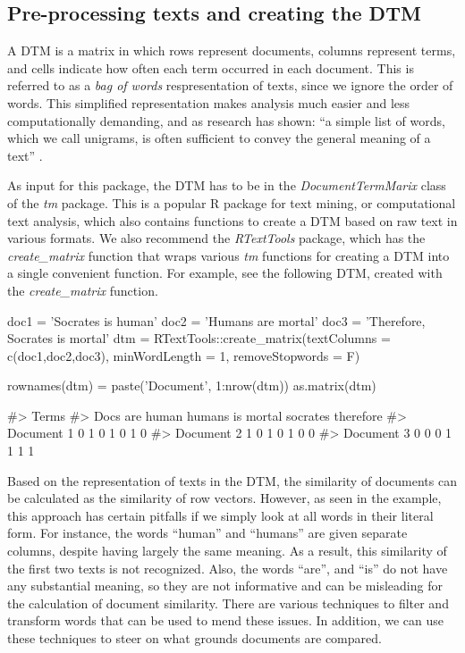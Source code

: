 \subsection{Pre-processing texts and creating the DTM}

A DTM is a matrix in which rows represent documents, columns represent
terms, and cells indicate how often each term occurred in each document.
This is referred to as a \emph{bag of words} respresentation of texts,
since we ignore the order of words. This simplified representation makes
analysis much easier and less computationally demanding, and as research
has shown: ``a simple list of words, which we call unigrams, is often
sufficient to convey the general meaning of a text''
\citep[6]{grimmer13}.

As input for this package, the DTM has to be in the
\emph{DocumentTermMarix} class of the \emph{tm} package. This is a
popular R package for text mining, or computational text analysis, which
also contains functions to create a DTM based on raw text in various
formats. We also recommend the \emph{RTextTools} package, which has the
\emph{create\_matrix} function that wraps various \emph{tm} functions
for creating a DTM into a single convenient function. For example, see
the following DTM, created with the \emph{create\_matrix} function.

\begin{Schunk}
\begin{Sinput}
doc1 = 'Socrates is human'
doc2 = 'Humans are mortal'
doc3 = 'Therefore, Socrates is mortal'
dtm = RTextTools::create_matrix(textColumns = c(doc1,doc2,doc3), 
                                minWordLength = 1, removeStopwords = F)

rownames(dtm) = paste('Document', 1:nrow(dtm))
as.matrix(dtm)
\end{Sinput}
\begin{Soutput}
#>             Terms
#> Docs         are human humans is mortal socrates therefore
#>   Document 1   0     1      0  1      0        1         0
#>   Document 2   1     0      1  0      1        0         0
#>   Document 3   0     0      0  1      1        1         1
\end{Soutput}
\end{Schunk}

Based on the representation of texts in the DTM, the similarity of
documents can be calculated as the similarity of row vectors. However,
as seen in the example, this approach has certain pitfalls if we simply
look at all words in their literal form. For instance, the words
``human'' and ``humans'' are given separate columns, despite having
largely the same meaning. As a result, this similarity of the first two
texts is not recognized. Also, the words ``are'', and ``is'' do not have
any substantial meaning, so they are not informative and can be
misleading for the calculation of document similarity. There are various
techniques to filter and transform words that can be used to mend these
issues. In addition, we can use these techniques to steer on what
grounds documents are compared.

